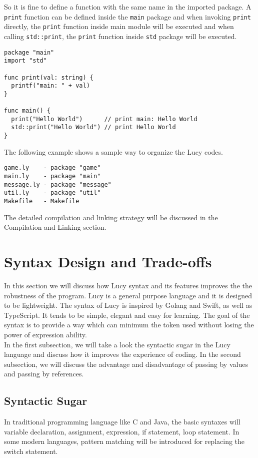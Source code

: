 So it is fine to define a function with the same name in the imported package. A \texttt{print} function can be defined inside the \texttt{main} package and when invoking \texttt{print} directly, the \texttt{print} function inside main module will be executed and when calling \texttt{std::print}, the \texttt{print} function inside \texttt{std} package will be executed.
\begin{lstlisting}
package "main"
import "std"

func print(val: string) {
  printf("main: " + val)
}

func main() {
  print("Hello World")      // print main: Hello World
  std::print("Hello World") // print Hello World
}
\end{lstlisting}
The following example shows a sample way to organize the Lucy codes.
\begin{lstlisting}
game.ly    - package "game"
main.ly    - package "main"
message.ly - package "message"
util.ly    - package "util"
Makefile   - Makefile
\end{lstlisting}
The detailed compilation and linking strategy will be discussed in the Compilation and Linking section.


\section{Syntax Design and Trade-offs}
In this section we will discuss how Lucy syntax and its features improves the the robustness of the program. Lucy is a general purpose language and it is designed to be lightweight. The syntax of Lucy is inspired by Golang and Swift, as well as TypeScript. It tends to be simple, elegant and easy for learning. The goal of the syntax is to provide a way which can minimum the token used without losing the power of expression ability. \\
In the first subsection, we will take a look the syntactic sugar in the Lucy language and discuss how it improves the experience of coding. In the second subsection, we will discuss the advantage and disadvantage of passing by values and passing by references.

\subsection{Syntactic Sugar}
In traditional programming language like C and Java, the basic syntaxes will variable declaration, assignment, expression, if statement, loop statement. In some modern languages, pattern matching will be introduced for replacing the switch statement.

